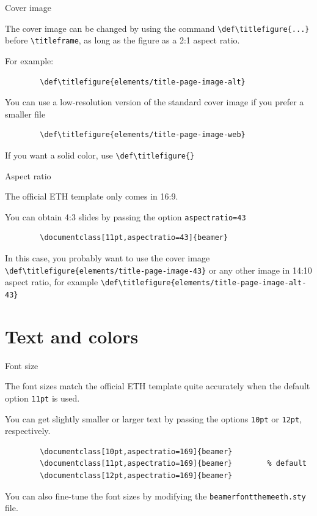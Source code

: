 \documentclass[11pt,aspectratio=169]{beamer}
\begin{document}
\begin{frame}[fragile]{Cover image}

	The cover image can be changed by using the command \verb+\def\titlefigure{...}+ before \verb+\titleframe+, as long as the figure as a 2:1 aspect ratio.
	
	For example:
	\begin{verbatim}
		\def\titlefigure{elements/title-page-image-alt}
	\end{verbatim}
	
	\bigskip
	
	You can use a low-resolution version of the standard cover image if you prefer a smaller file
	\begin{verbatim}
		\def\titlefigure{elements/title-page-image-web}
	\end{verbatim}
	
	\bigskip
	
	If you want a solid color, use \verb+\def\titlefigure{}+
	
\end{frame}


\begin{frame}[fragile]{Aspect ratio}

	The official ETH template only comes in 16:9.
	
	You can obtain 4:3 slides by passing the option \verb+aspectratio=43+
	\begin{verbatim}
		\documentclass[11pt,aspectratio=43]{beamer}	
	\end{verbatim}
		
	\bigskip
	
	In this case, you probably want to use the cover image \verb+\def\titlefigure{elements/title-page-image-43}+
	or any other image in 14:10 aspect ratio, for example \verb+\def\titlefigure{elements/title-page-image-alt-43}+
	
	
\end{frame}

\section{Text and colors}

\begin{frame}[fragile]{Font size}

	The font sizes match the official ETH template quite accurately when the default option \verb+11pt+ is used.
	
	\bigskip
	
	You can get slightly smaller or larger text by passing the options \verb+10pt+ or \verb+12pt+, respectively.
	\begin{verbatim}
		\documentclass[10pt,aspectratio=169]{beamer}
		\documentclass[11pt,aspectratio=169]{beamer}		% default
		\documentclass[12pt,aspectratio=169]{beamer}
	\end{verbatim}	
	
	\bigskip
	You can also fine-tune the font sizes by modifying the \verb+beamerfontthemeeth.sty+ file.

\end{frame}
\end{document}
